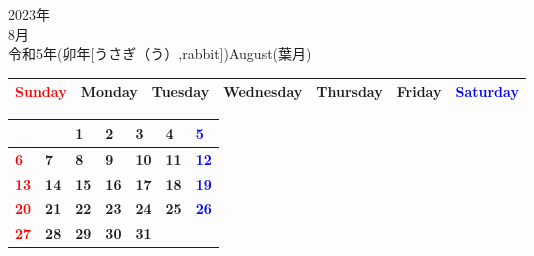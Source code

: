 \documentclass[a4paper,landscape]{jsarticle}
\newcommand{\dig}{\hspace{29mm}}
\newcommand{\tdig}{\hspace{27mm}}
\newcommand{\LBF}{\LARGE\textbf}
\begin{document}
\newpage

\begin{center}
	\HUGE 2023年\\
	\huge 8月\\
	\large 令和5年(卯年[うさぎ（う）,rabbit])August(葉月)
\end{center}

\begingroup
\renewcommand{\arraystretch}{1.4}
\begin{tabular}{|>{\centering\arraybackslash}p{32mm}|>{\centering\arraybackslash}p{32mm}|>{\centering\arraybackslash}p{32mm}|>{\centering\arraybackslash}p{32mm}|>{\centering\arraybackslash}p{32mm}|>{\centering\arraybackslash}p{32mm}|>{\centering\arraybackslash}p{32mm}|}
\hline
\textcolor{red}{\large Sunday}&\large Monday&\large Tuesday&\large Wednesday&\large Thursday&\large Friday&\textcolor{blue}{\large Saturday}\\
\hline
\end{tabular}
\endgroup

\begingroup
\renewcommand{\arraystretch}{4}
\begin{tabular}{|p{32mm}|p{32mm}|p{32mm}|p{32mm}|p{32mm}|p{32mm}|p{32mm}|}
\hline
&&\raisebox{30pt} {\dig\LBF{1}}&\raisebox{30pt} {\dig\LBF{2}}&\raisebox{30pt} {\dig\LBF{3}}&\raisebox{30pt} {\dig\LBF{4}}&\raisebox{30pt} {\dig\textcolor{blue}{\LBF{5}}}\\
\hline
\raisebox{30pt} {\dig\textcolor{red}{\LBF{6}}}&\raisebox{30pt} {\dig\LBF{7}}&\raisebox{30pt} {\dig\LBF{8}}&\raisebox{30pt} {\dig\LBF{9}}&\raisebox{30pt} {\tdig\LBF{10}}&\raisebox{30pt} {\tdig\LBF{11}}&\raisebox{30pt} {\tdig\textcolor{blue}{\LBF{12}}}\\
\hline
\raisebox{30pt} {\tdig\textcolor{red}{\LBF{13}}}&\raisebox{30pt} {\tdig\LBF{14}}&\raisebox{30pt} {\tdig\LBF{15}}&\raisebox{30pt} {\tdig\LBF{16}}&\raisebox{30pt} {\tdig\LBF{17}}&\raisebox{30pt} {\tdig\LBF{18}}&\raisebox{30pt} {\tdig\textcolor{blue}{\LBF{19}}}\\
\hline
\raisebox{30pt} {\tdig\textcolor{red}{\LBF{20}}}&\raisebox{30pt} {\tdig\LBF{21}}&\raisebox{30pt} {\tdig\LBF{22}}&\raisebox{30pt} {\tdig\LBF{23}}&\raisebox{30pt} {\tdig\LBF{24}}&\raisebox{30pt} {\tdig\LBF{25}}&\raisebox{30pt} {\tdig\textcolor{blue}{\LBF{26}}}\\
\hline
\raisebox{30pt} {\tdig\textcolor{red}{\LBF{27}}}&\raisebox{30pt} {\tdig\LBF{28}}&\raisebox{30pt} {\tdig\LBF{29}}&\raisebox{30pt} {\tdig\LBF{30}}&\raisebox{30pt} {\tdig\LBF{31}}&&\\
\hline
\end{tabular}
\endgroup
\end{document}
